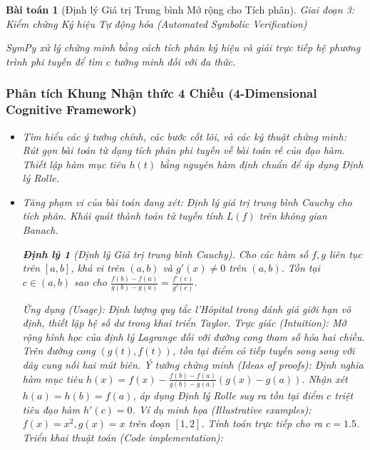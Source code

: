 \documentclass{article}
\newtheorem{baitoan}{Bài toán}
\newtheorem{dinhly}{Định lý}
\begin{document}
\begin{baitoan}[Định lý Giá trị Trung bình Mở rộng cho Tích phân]


\vspace{0.5em}\noindent\emph{Giai đoạn 3: Kiểm chứng Ký hiệu Tự động hóa (Automated Symbolic Verification)}
 
 \textsf{SymPy} xử lý chứng minh bằng cách tích phân ký hiệu và giải trực tiếp hệ phương trình phi tuyến để tìm $c$ tường minh đối với đa thức.



 \subsubsection*{Phân tích Khung Nhận thức 4 Chiều (4-Dimensional Cognitive Framework)}
 \begin{itemize}
 \item \textit{Tìm hiểu các ý tưởng chính, các bước cốt lõi, và các kỹ thuật chứng minh}: Rút gọn bài toán từ dạng tích phân phi tuyến về bài toán rễ của đạo hàm. Thiết lập hàm mục tiêu $h(t)$ bằng nguyên hàm định chuẩn để áp dụng Định lý Rolle.
 \item \textit{Tăng phạm vi của bài toán đang xét}: Định lý giá trị trung bình Cauchy cho tích phân. Khái quát thành toán tử tuyến tính $L(f)$ trên không gian Banach.

\begin{dinhly}[Định lý Giá trị trung bình Cauchy]
Cho các hàm số $f, g$ liên tục trên $[a, b]$, khả vi trên $(a, b)$ và $g'(x) \neq 0$ trên $(a, b)$. Tồn tại $c \in (a, b)$ sao cho $\frac{f(b) - f(a)}{g(b) - g(a)} = \frac{f'(c)}{g'(c)}$.
\end{dinhly}
\emph{Ứng dụng (Usage):} Định lượng quy tắc l'Hôpital trong đánh giá giới hạn vô định, thiết lập hệ số dư trong khai triển Taylor.
\emph{Trực giác (Intuition):} Mở rộng hình học của định lý Lagrange đối với đường cong tham số hóa hai chiều. Trên đường cong $(g(t), f(t))$, tồn tại điểm có tiếp tuyến song song với dây cung nối hai mút biên.
\emph{Ý tưởng chứng minh (Ideas of proofs):} Định nghĩa hàm mục tiêu $h(x) = f(x) - \frac{f(b) - f(a)}{g(b) - g(a)} (g(x) - g(a))$. Nhận xét $h(a) = h(b) = f(a)$, áp dụng Định lý Rolle suy ra tồn tại điểm $c$ triệt tiêu đạo hàm $h'(c) = 0$.
\emph{Ví dụ minh họa (Illustrative examples):} $f(x)=x^2, g(x)=x$ trên đoạn $[1, 2]$. Tính toán trực tiếp cho ra $c = 1.5$.
\emph{Triển khai thuật toán (Code implementation):}



\end{itemize}
\end{baitoan}
\end{document}
